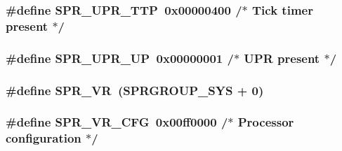 \hypertarget{spr-defs_8h_aedc2d673a8cb50b2b5b640c776eaf31b}{
\subsubsection[{\-S\-P\-R\-\_\-\-U\-P\-R\-\_\-\-T\-T\-P}]{\setlength{\rightskip}{0pt plus 5cm}\#define {\bf \-S\-P\-R\-\_\-\-U\-P\-R\-\_\-\-T\-T\-P}~0x00000400  /$\ast$ Tick timer present $\ast$/}}\label{spr-defs_8h_aedc2d673a8cb50b2b5b640c776eaf31b}
\hypertarget{spr-defs_8h_a29a503d6c90ce28f2f924f95f0d67d38}{
\subsubsection[{\-S\-P\-R\-\_\-\-U\-P\-R\-\_\-\-U\-P}]{\setlength{\rightskip}{0pt plus 5cm}\#define {\bf \-S\-P\-R\-\_\-\-U\-P\-R\-\_\-\-U\-P}~0x00000001  /$\ast$ U\-P\-R present $\ast$/}}\label{spr-defs_8h_a29a503d6c90ce28f2f924f95f0d67d38}
\hypertarget{spr-defs_8h_a9038658a322a8f6fc0e2b195bf512d01}{
\subsubsection[{\-S\-P\-R\-\_\-\-V\-R}]{\setlength{\rightskip}{0pt plus 5cm}\#define {\bf \-S\-P\-R\-\_\-\-V\-R}~({\bf \-S\-P\-R\-G\-R\-O\-U\-P\-\_\-\-S\-Y\-S} + 0)}}\label{spr-defs_8h_a9038658a322a8f6fc0e2b195bf512d01}
\hypertarget{spr-defs_8h_a0e3beda0d9a38b83a4f2ad2bd4129e03}{
\subsubsection[{\-S\-P\-R\-\_\-\-V\-R\-\_\-\-C\-F\-G}]{\setlength{\rightskip}{0pt plus 5cm}\#define {\bf \-S\-P\-R\-\_\-\-V\-R\-\_\-\-C\-F\-G}~0x00ff0000  /$\ast$ Processor configuration $\ast$/}}\label{spr-defs_8h_a0e3beda0d9a38b83a4f2ad2bd4129e03}
